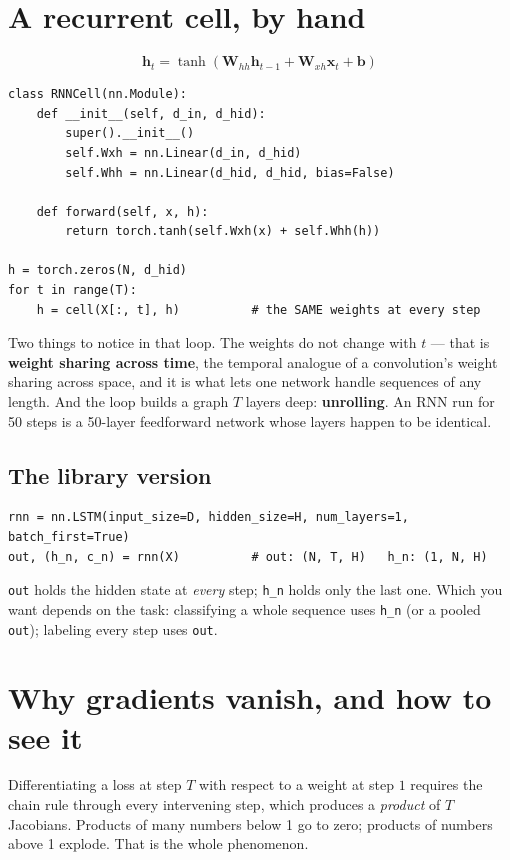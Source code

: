 \documentclass[11pt]{article}
\begin{document}
\section{A recurrent cell, by hand}

\[
\boldsymbol{h}_t = \tanh(\boldsymbol{W}_{hh}\boldsymbol{h}_{t-1} +
\boldsymbol{W}_{xh}\boldsymbol{x}_t + \boldsymbol{b})
\]

\begin{lstlisting}
class RNNCell(nn.Module):
    def __init__(self, d_in, d_hid):
        super().__init__()
        self.Wxh = nn.Linear(d_in, d_hid)
        self.Whh = nn.Linear(d_hid, d_hid, bias=False)

    def forward(self, x, h):
        return torch.tanh(self.Wxh(x) + self.Whh(h))

h = torch.zeros(N, d_hid)
for t in range(T):
    h = cell(X[:, t], h)          # the SAME weights at every step
\end{lstlisting}

Two things to notice in that loop. The weights do not change with $t$ --- that is
\textbf{weight sharing across time}, the temporal analogue of a convolution's
weight sharing across space, and it is what lets one network handle sequences of
any length. And the loop builds a graph $T$ layers deep: \textbf{unrolling}. An
RNN run for 50 steps is a 50-layer feedforward network whose layers happen to be
identical.

\subsection{The library version}

\begin{lstlisting}
rnn = nn.LSTM(input_size=D, hidden_size=H, num_layers=1, batch_first=True)
out, (h_n, c_n) = rnn(X)          # out: (N, T, H)   h_n: (1, N, H)
\end{lstlisting}

\texttt{out} holds the hidden state at \emph{every} step; \texttt{h\_n} holds only
the last one. Which you want depends on the task: classifying a whole sequence
uses \texttt{h\_n} (or a pooled \texttt{out}); labeling every step uses
\texttt{out}.

\section{Why gradients vanish, and how to see it}

Differentiating a loss at step $T$ with respect to a weight at step $1$ requires
the chain rule through every intervening step, which produces a \emph{product} of
$T$ Jacobians. Products of many numbers below 1 go to zero; products of numbers
above 1 explode. That is the whole phenomenon.
\end{document}
